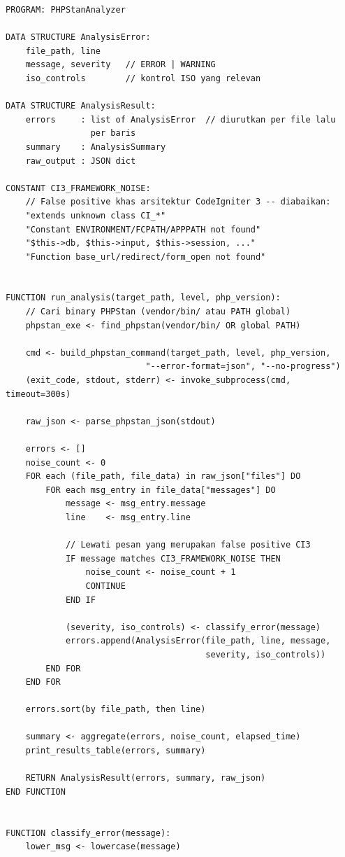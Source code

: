 \begin{lstlisting}[style=pseudocodestyle]
PROGRAM: PHPStanAnalyzer

DATA STRUCTURE AnalysisError:
    file_path, line
    message, severity   // ERROR | WARNING
    iso_controls        // kontrol ISO yang relevan

DATA STRUCTURE AnalysisResult:
    errors     : list of AnalysisError  // diurutkan per file lalu 
                 per baris
    summary    : AnalysisSummary
    raw_output : JSON dict

CONSTANT CI3_FRAMEWORK_NOISE:
    // False positive khas arsitektur CodeIgniter 3 -- diabaikan:
    "extends unknown class CI_*"
    "Constant ENVIRONMENT/FCPATH/APPPATH not found"
    "$this->db, $this->input, $this->session, ..."
    "Function base_url/redirect/form_open not found"


FUNCTION run_analysis(target_path, level, php_version):
    // Cari binary PHPStan (vendor/bin/ atau PATH global)
    phpstan_exe <- find_phpstan(vendor/bin/ OR global PATH)

    cmd <- build_phpstan_command(target_path, level, php_version,
                            "--error-format=json", "--no-progress")
    (exit_code, stdout, stderr) <- invoke_subprocess(cmd, timeout=300s)

    raw_json <- parse_phpstan_json(stdout)

    errors <- []
    noise_count <- 0
    FOR each (file_path, file_data) in raw_json["files"] DO
        FOR each msg_entry in file_data["messages"] DO
            message <- msg_entry.message
            line    <- msg_entry.line

            // Lewati pesan yang merupakan false positive CI3
            IF message matches CI3_FRAMEWORK_NOISE THEN
                noise_count <- noise_count + 1
                CONTINUE
            END IF

            (severity, iso_controls) <- classify_error(message)
            errors.append(AnalysisError(file_path, line, message,
                                        severity, iso_controls))
        END FOR
    END FOR

    errors.sort(by file_path, then line)

    summary <- aggregate(errors, noise_count, elapsed_time)
    print_results_table(errors, summary)

    RETURN AnalysisResult(errors, summary, raw_json)
END FUNCTION


FUNCTION classify_error(message):
    lower_msg <- lowercase(message)


\end{lstlisting}
